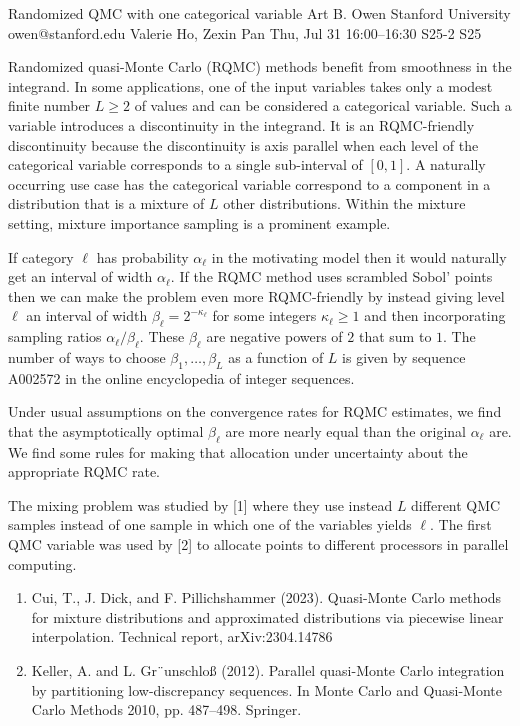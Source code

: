\begin{talk}
  {Randomized QMC with one categorical variable}%
  {Art B. Owen}%
  {Stanford University}%
  {owen@stanford.edu}%
  {Valerie Ho, Zexin Pan}%
  {}%
  {Thu, Jul 31 16:00--16:30}%
  {S25-2}%
  {S25}%
  
    
   
  Randomized quasi-Monte Carlo (RQMC) methods benefit from smoothness
  in the integrand.  In some applications, one of the input variables takes
  only a modest finite number $L\geqslant2$
of values and can be considered a categorical
  variable. Such a variable introduces a discontinuity in the integrand.  It is
  an RQMC-friendly discontinuity because the discontinuity is axis parallel
  when each level of the categorical variable corresponds to a single
  sub-interval of $[0,1]$.  A naturally occurring use case has
  the categorical variable correspond to a component in a distribution
  that is a mixture of $L$ other distributions.  Within the mixture
  setting, mixture importance sampling is a prominent example.

 If category $\ell$  has probability $\alpha_\ell$ in the motivating
  model then it would naturally get an interval of width $\alpha_\ell$.
If the RQMC method uses scrambled Sobol' points
then we can make the problem even more RQMC-friendly by instead giving
  level $\ell$ an interval of width $\beta_\ell = 2^{-\kappa_\ell}$
  for some integers $\kappa_\ell \geqslant1$ and then
  incorporating sampling ratios $\alpha_\ell/\beta_\ell$.
  These $\beta_\ell$ are negative powers of $2$ that sum to $1$.
  The number of ways to choose $\beta_1,\dots,\beta_L$
  as a function of $L$ is given by sequence A002572 in the
  online encyclopedia of integer sequences.

  Under usual assumptions on the convergence rates for RQMC
  estimates, we find that the asymptotically optimal $\beta_\ell$
  are more nearly equal than the original $\alpha_\ell$ are.
  We find some rules for making that  allocation under uncertainty
  about the appropriate RQMC rate.

  The mixing problem was studied by [1] where they use instead
  $L$ different QMC samples instead of one sample in which
  one of the variables yields $\ell$. The first QMC variable
  was used by [2] to allocate points to different processors
  in parallel computing.

\medskip
\begin{enumerate}
 \item[{[1]}] Cui, T., J. Dick, and F. Pillichshammer (2023). Quasi-Monte Carlo methods
for mixture distributions and approximated distributions via piecewise linear
interpolation. Technical report, arXiv:2304.14786 
\item[{[2]}]
Keller, A. and L. Gr¨unschlo{\ss} (2012). Parallel quasi-Monte Carlo integration by
partitioning low-discrepancy sequences. In Monte Carlo and Quasi-Monte
Carlo Methods 2010, pp. 487--498. Springer.
\end{enumerate}

\end{talk}

